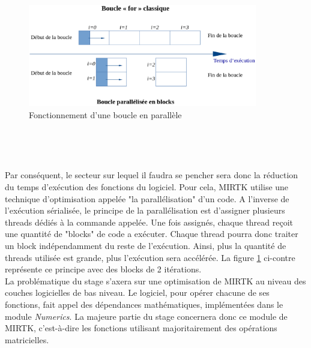 \documentclass[10pt]{report}
\begin{document}
	\vspace{-0.5cm}
	\begin{figure}
		\includegraphics[width=10cm]{Reports/figures/gfor.eps}	
		\caption{Fonctionnement d'une boucle en parallèle}
		\label{Fonctionnement d'une boucle en parallèle}
	\end{figure}
	~\par~\par
	Par conséquent, le secteur sur lequel il faudra se pencher sera donc la réduction du temps d'exécution des fonctions du logiciel. Pour cela, MIRTK utilise une technique d'optimisation appelée "la parallélisation" d'un code. A l'inverse de l'exécution sérialisée, le principe de la parallélisation est d'assigner plusieurs threads dédiés à la commande appelée. Une fois assignés, chaque thread reçoit une quantité de "blocks" de code a exécuter. Chaque thread pourra donc traiter un block indépendamment du reste de l'exécution. Ainsi, plus la quantité de threads utilisée est grande, plus l'exécution sera accélérée. La figure \ref{Fonctionnement d'une boucle en parallèle} ci-contre représente ce principe avec des blocks de 2 itérations.\\

	La problématique du stage s'axera sur une optimisation de MIRTK au niveau des couches logicielles de bas niveau. Le logiciel, pour opérer chacune de ses fonctions, fait appel des dépendances mathématiques, implémentées dans le module \textit{Numerics}. La majeure partie du stage concernera donc ce module de MIRTK, c'est-à-dire les fonctions utilisant majoritairement des opérations matricielles.\\
\end{document}

